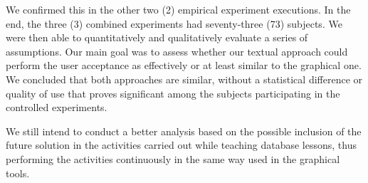 We confirmed this in the other two (2) empirical experiment executions.
In the end, the three (3) combined experiments had seventy-three (73) subjects.
We were then able to quantitatively and qualitatively evaluate a series of assumptions.
Our main goal was to assess whether our textual approach could perform the user acceptance as effectively or at least similar to the graphical one.
We concluded that both approaches are similar, without a statistical difference or quality of use that proves significant among the subjects participating in the controlled experiments.

We still intend to conduct a better analysis based on the possible inclusion of the future solution in the activities carried out while teaching database lessons, thus performing the activities continuously in the same way used in the graphical tools.

